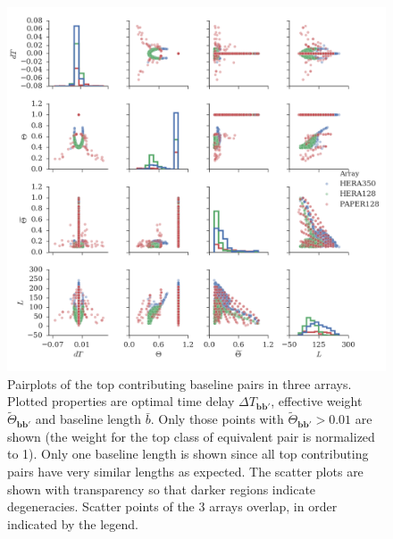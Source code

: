 \documentclass[twocolumn,apj,numberedappendix]{emulateapj}
\renewcommand\[{\begin{equation}}
\renewcommand\]{\end{equation}}
\begin{document}
\begin{figure}[H]
\includegraphics[width=\linewidth]{pairplot}

\caption{Pairplots of the top contributing baseline pairs in three arrays. Plotted properties are optimal time delay $\Delta T_{\boldsymbol{bb'}}$,  effective weight $\widetilde{\Theta}_{\boldsymbol{bb'}}$ and baseline length $\bar{b}$. Only those points with $\widetilde{\Theta}_{\boldsymbol{bb'}}>0.01$ are shown (the weight for the top class of equivalent pair is normalized to 1). Only one baseline length is shown since all top contributing pairs have very similar lengths as expected. The scatter plots are shown with transparency so that darker regions indicate degeneracies. Scatter points of the 3 arrays overlap, in order indicated by the legend. }
\label{fig:pairplot}
\end{figure}
\end{document}

